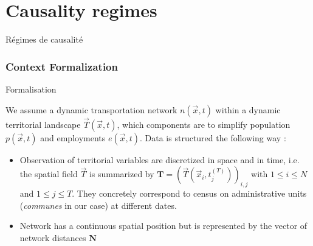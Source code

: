 \stars






\newpage


\section{Causality regimes}{Régimes de causalité}

\label{app:sec:causalityregimes}






\subsubsection{Context Formalization}{Formalisation}



We assume a dynamic transportation network $n(\vec{x},t)$ within a dynamic territorial landscape $\vec{T}(\vec{x},t)$, which components are to simplify population $p(\vec{x},t)$ and employments $e(\vec{x},t)$. Data is structured the following way :
\begin{itemize}
\item Observation of territorial variables are discretized in space and in time, i.e. the spatial field $\vec{T}$ is summarized by $\mathbf{T} = \left(\vec{T}(\vec{x}_i,t_j^{(T)})\right)_{i,j}$ with $1\leq i \leq N$ and $1\leq j \leq T$. They concretely correspond to census on administrative units (\emph{communes} in our case) at different dates.
\item Network has a continuous spatial position but is represented by the vector of network distances $\mathbf{N}$ 
\end{itemize}






